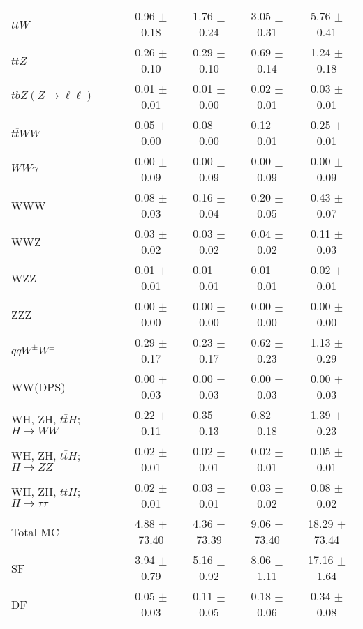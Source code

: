 \begin{tabular}{l|cccc}
                   $t\overline{t}W$ &  0.96 $\pm$  0.18 &  1.76 $\pm$  0.24 &  3.05 $\pm$  0.31 &  5.76 $\pm$  0.41 \\
                   $t\overline{t}Z$ &  0.26 $\pm$  0.10 &  0.29 $\pm$  0.10 &  0.69 $\pm$  0.14 &  1.24 $\pm$  0.18 \\
    $tbZ (Z \rightarrow \ell \ell)$ &  0.01 $\pm$  0.01 &  0.01 $\pm$  0.00 &  0.02 $\pm$  0.01 &  0.03 $\pm$  0.01 \\
                  $t\overline{t}WW$ &  0.05 $\pm$  0.00 &  0.08 $\pm$  0.00 &  0.12 $\pm$  0.01 &  0.25 $\pm$  0.01 \\
                         $WW\gamma$ &  0.00 $\pm$  0.09 &  0.00 $\pm$  0.09 &  0.00 $\pm$  0.09 &  0.00 $\pm$  0.09 \\
                                WWW &  0.08 $\pm$  0.03 &  0.16 $\pm$  0.04 &  0.20 $\pm$  0.05 &  0.43 $\pm$  0.07 \\
                                WWZ &  0.03 $\pm$  0.02 &  0.03 $\pm$  0.02 &  0.04 $\pm$  0.02 &  0.11 $\pm$  0.03 \\
                                WZZ &  0.01 $\pm$  0.01 &  0.01 $\pm$  0.01 &  0.01 $\pm$  0.01 &  0.02 $\pm$  0.01 \\
                                ZZZ &  0.00 $\pm$  0.00 &  0.00 $\pm$  0.00 &  0.00 $\pm$  0.00 &  0.00 $\pm$  0.00 \\
                 $qqW^{\pm}W^{\pm}$ &  0.29 $\pm$  0.17 &  0.23 $\pm$  0.17 &  0.62 $\pm$  0.23 &  1.13 $\pm$  0.29 \\
                            WW(DPS) &  0.00 $\pm$  0.03 &  0.00 $\pm$  0.03 &  0.00 $\pm$  0.03 &  0.00 $\pm$  0.03 \\
WH, ZH, $t\bar{t}H$; $H \rightarrow WW$ &  0.22 $\pm$  0.11 &  0.35 $\pm$  0.13 &  0.82 $\pm$  0.18 &  1.39 $\pm$  0.23 \\
WH, ZH, $t\bar{t}H$; $H \rightarrow ZZ$ &  0.02 $\pm$  0.01 &  0.02 $\pm$  0.01 &  0.02 $\pm$  0.01 &  0.05 $\pm$  0.01 \\
WH, ZH, $t\bar{t}H$; $H \rightarrow \tau\tau$ &  0.02 $\pm$  0.01 &  0.03 $\pm$  0.01 &  0.03 $\pm$  0.02 &  0.08 $\pm$  0.02 \\
\hline\hline
                           Total MC &  4.88 $\pm$ 73.40 &  4.36 $\pm$ 73.39 &  9.06 $\pm$ 73.40 & 18.29 $\pm$ 73.44 \\
\hline
                                 SF &  3.94 $\pm$  0.79 &  5.16 $\pm$  0.92 &  8.06 $\pm$  1.11 & 17.16 $\pm$  1.64 \\
                                 DF &  0.05 $\pm$  0.03 &  0.11 $\pm$  0.05 &  0.18 $\pm$  0.06 &  0.34 $\pm$  0.08 \\

\end{tabular}
